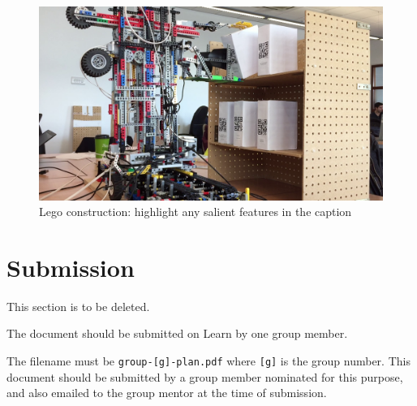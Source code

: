 \documentclass{article}
\begin{document}
\begin{figure}[tb]
\vskip 5mm
\begin{center}
\centerline{\includegraphics[width=\columnwidth]{figs/crane}}
\caption{Lego construction: highlight any salient features in the caption}
\label{fig:sample-fig}
\end{center}
\vskip -5mm
\end{figure} 

\section*{Submission}
This section is to be deleted.

The document should be submitted on Learn by one group member.

The filename must be  \verb|group-[g]-plan.pdf| where \verb|[g]| is the group number.
This document should be submitted by a group member nominated for this purpose, and also emailed to the group mentor at the time of submission.



\end{document}
